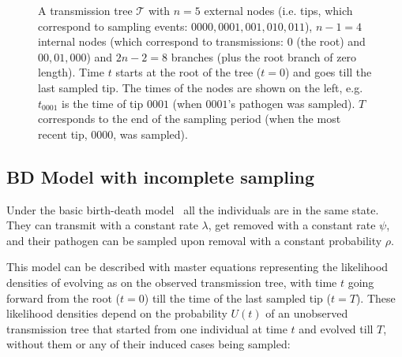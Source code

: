 \documentclass[a4paper,10pt]{article}
\begin{document}
\begin{figure}[tbhp]
\centering 

\caption{A transmission tree $\mathscr{T}$ with $n=5$ external nodes (i.e. tips, which correspond to sampling events: $0000, 0001, 001, 010, 011$), $n-1=4$ internal nodes (which correspond to transmissions: $0$ (the root) and $00, 01, 000$) and $2n - 2 = 8$ branches (plus the root branch of zero length). %
Time $t$ starts at the root of the tree ($t=0$) and goes till the last sampled tip. The times of the nodes are shown on the left, e.g. $t_{0001}$ is the time of tip $0001$ (when $0001$'s pathogen was sampled). $T$ corresponds to the end of the sampling period (when the most recent tip, $0000$, was sampled).}
\label{fig:tt} 
\end{figure}

\subsection{BD Model with incomplete sampling}
Under the basic birth-death model~\citep{Stadler2009} all the individuals are in the same state. They can transmit with a constant rate $\lambda$, get removed with a constant rate $\psi$, and their pathogen can be sampled upon removal with a constant probability $\rho$. 


This model can be described with master equations representing the likelihood densities of evolving as on the observed transmission tree, with time $t$ going forward from the root ($t=0$) till the time of the last sampled tip ($t=T$). These likelihood densities depend on the probability $U(t)$ of an unobserved transmission tree that started from one individual at time $t$ and evolved till $T$, without them or any of their induced cases being sampled: 
\end{document}
